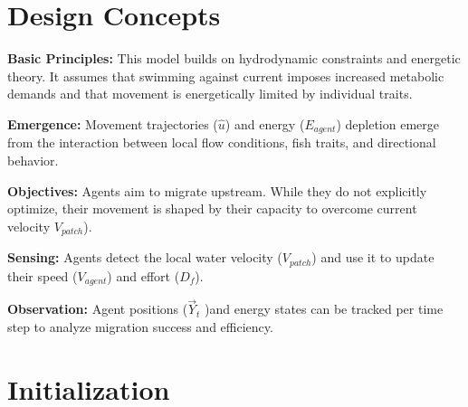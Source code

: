\documentclass[
]{book}
\begin{document}
\section{Design Concepts}\label{design-concepts-2}

\textbf{Basic Principles:} This model builds on hydrodynamic constraints and energetic theory. It assumes that swimming against current imposes increased metabolic demands and that movement is energetically limited by individual traits.

\textbf{Emergence:} Movement trajectories (\(\hat{u}\)) and energy (\(E_{agent}\)) depletion emerge from the interaction between local flow conditions, fish traits, and directional behavior.

\textbf{Objectives:} Agents aim to migrate upstream. While they do not explicitly optimize, their movement is shaped by their capacity to overcome current velocity \(V_{patch}\)).

\textbf{Sensing:} Agents detect the local water velocity (\(V_{patch}\)) and use it to update their speed (\(V_{agent}\)) and effort (\(D_{f}\)).

\textbf{Observation:} Agent positions (\(\vec{Y}_t\) )and energy states can be tracked per time step to analyze migration success and efficiency.

\section{Initialization}\label{initialization-2}
\end{document}
